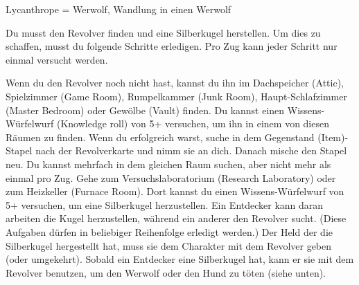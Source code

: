 
Lycanthrope = Werwolf, Wandlung in einen Werwolf





Du musst den Revolver finden und eine Silberkugel herstellen. Um dies zu schaffen, musst du folgende Schritte erledigen. Pro Zug kann jeder Schritt nur einmal versucht werden.
  \begin{itemize}
        \bitem Wenn du den Revolver noch nicht hast, kannst du ihn im Dachspeicher (Attic), Spielzimmer (Game Room), Rumpelkammer (Junk Room), Haupt-Schlafzimmer (Master Bedroom) oder Gewölbe (Vault) finden. Du kannst einen Wissens-Würfelwurf (Knowledge roll) von 5+ versuchen, um ihn in einem von diesen Räumen zu finden. Wenn du erfolgreich warst, suche in dem Gegenstand (Item)-Stapel nach der Revolverkarte und nimm sie an dich. Danach mische den Stapel neu. Du kannst mehrfach in dem gleichen Raum suchen, aber nicht mehr als einmal pro Zug.
        \bitem Gehe zum Versuchslaboratorium (Research Laboratory) oder zum Heizkeller (Furnace Room). Dort kannst du einen Wissens-Würfelwurf von 5+ versuchen, um eine Silberkugel herzustellen. Ein Entdecker kann daran arbeiten die Kugel herzustellen, während ein anderer den Revolver sucht. (Diese Aufgaben dürfen in beliebiger Reihenfolge erledigt werden.)
        \bitem Der Held der die Silberkugel hergestellt hat, muss sie dem Charakter mit dem Revolver geben (oder umgekehrt).
        \bitem Sobald ein Entdecker eine Silberkugel hat, kann er sie mit dem Revolver benutzen, um den Werwolf oder den Hund zu töten (siehe unten).
    \end{itemize}

